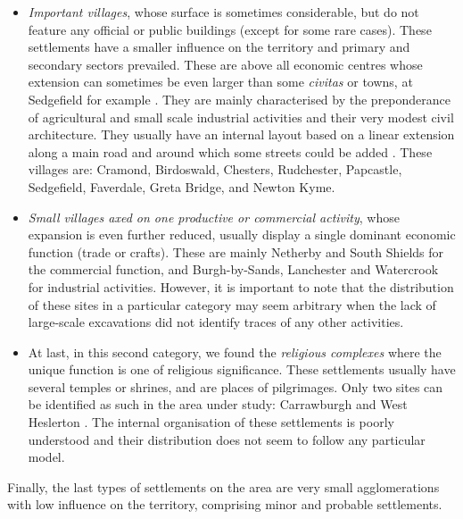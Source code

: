 \begin{itemize}
\item \emph{Important villages}, whose surface is sometimes considerable, but do not feature any official or public buildings (except for some rare cases). These settlements have a smaller influence on the territory and primary and secondary sectors prevailed. These are above all economic centres whose extension can sometimes be even larger than some \textit{civitas} or towns, at Sedgefield for example \parencite[264]{Burnham_2007}. They are mainly characterised by the preponderance of agricultural and small scale industrial activities and their very modest civil architecture. They usually have an internal layout based on a linear extension along a main road and around which some streets could be added \parencites[see e.g.][]{Hodgson_2009}{Proctor_2012}{Sommer_1984}{Sommer_2006}{Wilmott_2001}. These villages are: Cramond, Birdoswald, Chesters, Rudchester, Papcastle, Sedgefield, Faverdale, Greta Bridge, and Newton Kyme.

\item \emph{Small villages axed on one productive or commercial activity}, whose expansion is even further reduced, usually display a single dominant economic function (trade or crafts). These are mainly Netherby and South Shields \parencites{Cleary_1997}{Snape_2010} for the commercial function, and Burgh-by-Sands, Lanchester and Watercrook \parencites{Breeze_2009}{Potter_1979} for industrial activities. However, it is important to note that the distribution of these sites in a particular category may seem arbitrary when the lack of large-scale excavations did not identify traces of any other activities.

\item At last, in this second category, we found the \emph{religious complexes} where the unique function is one of religious significance. These settlements usually have several temples or shrines, and are places of pilgrimages. Only two sites can be identified as such in the area under study: Carrawburgh \parencite{Snape_1994a} and West Heslerton \parencite{Powlesland_1998}. The internal organisation of these settlements is poorly understood and their distribution does not seem to follow any particular model.
\end{itemize}

Finally, the last types of settlements on the area are very small agglomerations with low influence on the territory, comprising minor and probable settlements.

